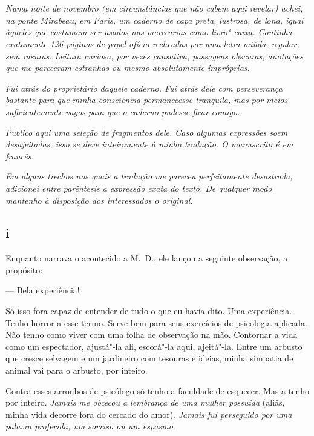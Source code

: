 \chapter*{}

\emph{Numa noite de novembro (em circunstâncias que não cabem aqui
revelar) achei, na ponte Mirabeau, em Paris, um caderno de capa preta,
lustrosa, de lona, igual àqueles que costumam ser usados nas
mercearias como livro"-caixa. Continha exatamente 126 páginas de papel
ofício recheadas por uma letra miúda, regular, sem rasuras. Leitura
curiosa, por vezes cansativa, passagens obscuras, anotações que me
pareceram estranhas ou mesmo absolutamente impróprias.}

\emph{Fui atrás do proprietário daquele caderno. Fui atrás dele com
perseverança bastante para que minha consciência permanecesse tranquila,
mas por meios suficientemente vagos para que o caderno pudesse ficar comigo.}

\emph{Publico aqui uma seleção de fragmentos dele. Caso algumas
expressões soem desajeitadas, isso se deve inteiramente à minha
tradução. O manuscrito é em francês.}

\emph{Em alguns trechos nos quais a tradução me pareceu perfeitamente
desastrada, adicionei entre parêntesis a expressão exata do texto. De
qualquer modo mantenho à disposição dos interessados o original.}

\pagebreak

\section{i}

Enquanto narrava o acontecido a M.~D., ele lançou a seguinte
observação, a propósito:

--- Bela experiência!

Só isso fora capaz de entender de tudo o que eu havia dito. Uma
experiência. Tenho horror a esse termo. Serve bem para seus
exercícios de psicologia aplicada. Não tenho como viver com uma folha de
observação na mão. Contornar a vida como um espectador, ajustá"-la ali,
escorá"-la aqui, ajeitá"-la. Entre um arbusto que cresce selvagem e um
jardineiro com tesouras e ideias, minha simpatia de animal vai para o
arbusto, por inteiro.

Contra esses arroubos de psicólogo só tenho a faculdade de esquecer. Mas
a tenho por inteiro. \emph{Jamais me obcecou a lembrança de uma mulher
possuída} (aliás, minha vida decorre fora do cercado do amor).
\emph{Jamais fui perseguido por uma palavra proferida, um sorriso ou
um espasmo}.

